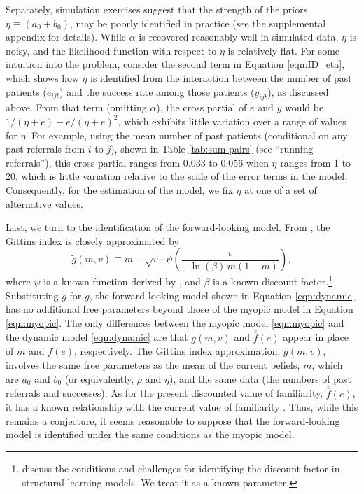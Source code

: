 \documentclass[12pt]{article}
\begin{document}
Separately, simulation exercises suggest that the strength of the priors, $\eta \equiv (a_0 + b_0)$, may be poorly identified in practice (see the supplemental appendix for details). While $\alpha$ is recovered reasonably well in simulated data, $\eta$ is noisy, and the likelihood function with respect to $\eta$ is relatively flat. For some intuition into the problem, consider the second term in Equation \eqref{eqn:ID_eta}, which shows how $\eta$ is identified from the interaction between the number of past patients ($e_{ijt}$) and the success rate among those patients ($\bar y_{ijt}$), as discussed above. From that term (omitting $\alpha$), the cross partial of $e$ and $\bar y$ would be $1/(\eta + e) - e/(\eta + e)^2$, which exhibits little variation over a range of values for $\eta$. For example, using the mean number of past patients (conditional on any past referrals from $i$ to $j$), shown in Table \ref{tab:sum-pairs}  (see ``running referrals''), this cross partial ranges from 0.033 to 0.056 when $\eta$ ranges from 1 to 20, which is little variation relative to the scale of the error terms in the model. Consequently, for the estimation of the model, we fix $\eta$ at one of a set of alternative values.

Last, we turn to the identification of the forward-looking model. From \cite{brezzi2002}, the Gittins index is closely approximated by 
\begin{equation}
\tilde g(m,v) \equiv    m + \sqrt{v} \cdot \psi \left( \frac{v}{-\ln(\beta) \, m (1-m)} \right),
\label{eqn:gittins_approx}    
\end{equation}
where $\psi$ is a known function derived by \cite{brezzi2002}, and $\beta$ is a known discount factor.\footnote{\cite{ching2013} discuss the conditions and challenges for identifying the discount factor in structural learning models. We treat it as a known parameter.} Substituting $\tilde g$ for $g$, the forward-looking model shown in Equation \eqref{eqn:dynamic} has no additional free parameters beyond those of the myopic model in Equation \eqref{eqn:myopic}. The only differences between the myopic model \eqref{eqn:myopic} and the dynamic model \eqref{eqn:dynamic} are that $\tilde g(m,v)$ and $\overline{\overline{f}}(e)$ appear in place of $m$ and $f(e)$, respectively. The Gittins index approximation, $\tilde g(m,v)$, involves the same free parameters as the mean of the current beliefs, $m$, which are $a_0$ and $b_0$ (or equivalently, $\rho$ and $\eta$), and the same data (the numbers of past referrals and successes). As for the present discounted value of familiarity, $\overline{\overline{f}}(e)$, it has a known relationship with the current value of familiarity \citep[see][for an equivalent result applied to an effect of learning by doing]{gong2018}. Thus, while this remains a conjecture, it seems reasonable to suppose that the forward-looking model is identified under the same conditions as the myopic model.
\end{document}
